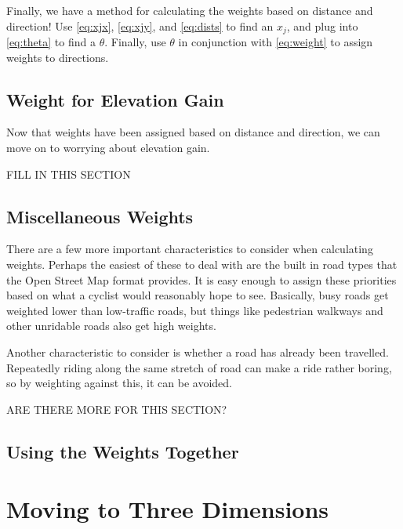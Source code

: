 \documentclass[twocolumn,11pt]{article}
\begin{document}
Finally, we have a method for calculating the weights based on distance and
direction! Use \eqref{eq:xjx}, \eqref{eq:xjy}, and \eqref{eq:dists} to find
an $x_j$, and plug into \eqref{eq:theta} to find a $\theta$. Finally, use
$\theta$ in conjunction with \eqref{eq:weight} to assign weights to
directions.

\subsection{Weight for Elevation Gain}

Now that weights have been assigned based on distance and direction, we can
move on to worrying about elevation gain.

FILL IN THIS SECTION

\subsection{Miscellaneous Weights}

There are a few more important characteristics to consider when calculating
weights. Perhaps the easiest of these to deal with are the built in road types
that the Open Street Map format provides. It is easy enough to assign these
priorities based on what a cyclist would reasonably hope to see. Basically,
busy roads get weighted lower than low-traffic roads, but things like
pedestrian walkways and other unridable roads also get high weights.

Another characteristic to consider is whether a road has already been
travelled. Repeatedly riding along the same stretch of road can make a ride
rather boring, so by weighting against this, it can be avoided.

ARE THERE MORE FOR THIS SECTION?

\subsection{Using the Weights Together}

\section{Moving to Three Dimensions} \label{sec:latlong}
\end{document}
